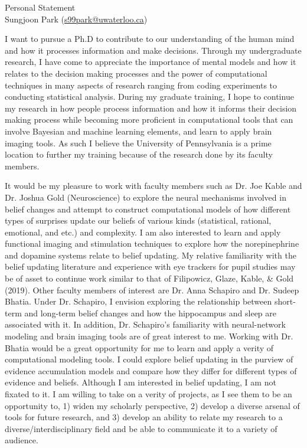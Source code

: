\documentclass[12pt]{article}
\let\oldcenter\center
\let\oldendcenter\endcenter
\renewenvironment{center}{\setlength\topsep{-1pt}\oldcenter}{\oldendcenter}
\begin{document}
\begin{center}
{\Large Personal Statement} \\
{\normalsize Sungjoon Park (\href{mailto:s99park@uwaterloo.ca}{s99park@uwaterloo.ca})}
\end{center}

I want to pursue a Ph.D to contribute to our understanding of the human mind and how it processes information and make decisions. Through my undergraduate research, I have come to appreciate the importance of mental models and how it relates to the decision making processes and the power of computational techniques in many aspects of research ranging from coding experiments to conducting statistical analysis. During my graduate training, I hope to continue my research in how people process information and how it informs their decision making process while becoming more proficient in computational tools that can involve Bayesian and machine learning elements, and learn to apply brain imaging tools. As such I believe the University of Pennsylvania is a prime location to further my training because of the research done by its faculty members.

It would be my pleasure to work with faculty members such as Dr. Joe Kable and Dr. Joshua Gold (Neuroscience) to explore the neural mechanisms involved in belief changes and attempt to construct computational models of how different types of surprises update our beliefs of various kinds (statistical, rational, emotional, and etc.) and complexity. I am also interested to learn and apply functional imaging and stimulation techniques to explore how the norepinephrine and dopamine systems relate to belief updating. My relative familiarity with the belief updating literature and experience with eye trackers for pupil studies may be of asset to continue work similar to that of Filipowicz, Glaze, Kable, \& Gold (2019). Other faculty members of interest are Dr. Anna Schapiro and Dr. Sudeep Bhatia. Under Dr. Schapiro, I envision exploring the relationship between short-term and long-term belief changes and how the hippocampus and sleep are associated with it. In addition, Dr. Schapiro’s familiarity with neural-network modeling and brain imaging tools are of great interest to me. Working with Dr. Bhatia would be a great opportunity for me to learn and apply a verity of computational modeling tools. I could explore belief updating in the purview of evidence accumulation models and compare how they differ for different types of evidence and beliefs. Although I am interested in belief updating, I am not fixated to it. I am willing to take on a verity of projects, as I see them to be an opportunity to, 1) widen my scholarly perspective, 2) develop a diverse arsenal of tools for future research, and 3) develop an ability to relate my research to a diverse/interdisciplinary field and be able to communicate it to a variety of audience.
\end{document}

